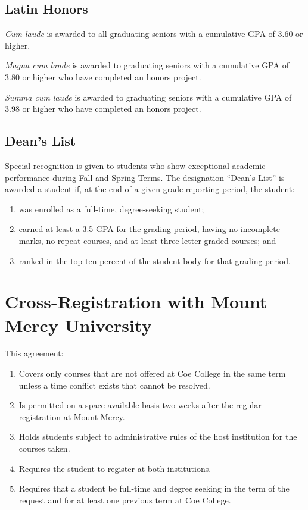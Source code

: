\documentclass[
  letterpaper,
]{scrbook}
\providecommand{\tightlist}{%
  \setlength{\itemsep}{0pt}\setlength{\parskip}{0pt}}
\begin{document}
\subsection{Latin Honors}\label{latin-honors}

\emph{Cum laude} is awarded to all graduating seniors with a cumulative
GPA of 3.60 or higher.

\emph{Magna cum laude} is awarded to graduating seniors with a
cumulative GPA of 3.80 or higher who have completed an honors project.

\emph{Summa cum laude} is awarded to graduating seniors with a
cumulative GPA of 3.98 or higher who have completed an honors project.

\subsection{Dean's List}\label{deans-list}

Special recognition is given to students who show exceptional academic
performance during Fall and Spring Terms. The designation ``Dean's
List'' is awarded a student if, at the end of a given grade reporting
period, the student:

\begin{enumerate}
\def\labelenumi{\arabic{enumi}.}
\tightlist
\item
  was enrolled as a full-time, degree-seeking student;
\item
  earned at least a 3.5 GPA for the grading period, having no incomplete
  marks, no repeat courses, and at least three letter graded courses;
  and
\item
  ranked in the top ten percent of the student body for that grading
  period.
\end{enumerate}

\section{Cross-Registration with Mount Mercy
University}\label{cross-registration-with-mount-mercy-university}

This agreement:

\begin{enumerate}
\def\labelenumi{\arabic{enumi}.}
\tightlist
\item
  Covers only courses that are not offered at Coe College in the same
  term unless a time conflict exists that cannot be resolved.
\item
  Is permitted on a space-available basis two weeks after the regular
  registration at Mount Mercy.
\item
  Holds students subject to administrative rules of the host institution
  for the courses taken.
\item
  Requires the student to register at both institutions.
\item
  Requires that a student be full-time and degree seeking in the term of
  the request and for at least one previous term at Coe College.
\end{enumerate}
\end{document}
